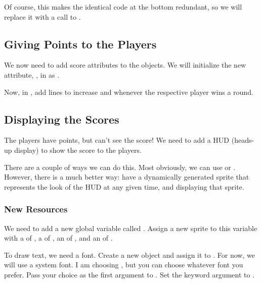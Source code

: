 \documentclass[letterpaper,10pt,english]{sphinxmanual}
\begin{document}
Of course, this makes the identical code at the bottom redundant, so we
will replace it with a call to .


\subsection{Giving Points to the Players}
\label{pong_better:giving-points-to-the-players}
We now need to add score attributes to the  objects.  We
will initialize the new attribute, , in
 as .

Now, in , add lines to increase
 and  whenever the respective
player wins a round.


\subsection{Displaying the Scores}
\label{pong_better:displaying-the-scores}
The players have points, but can't see the score!  We need to add a HUD
(heads-up display) to show the score to the players.

There are a couple of ways we can do this.  Most obviously, we can use
{\hyperref[dsp:sge.dsp.Game.project_text]{\emph{}}} or {\hyperref[dsp:sge.dsp.Room.project_text]{\emph{}}}.
However, there is a much better way: have a dynamically generated sprite
that represents the look of the HUD at any given time, and displaying
that sprite.


\subsubsection{New Resources}
\label{pong_better:new-resources}
We need to add a new global variable called .  Assign
a new sprite to this variable with a  of , a
 of , an  of , and an
 of .

To draw text, we need a font.  Create a new {\hyperref[gfx:sge.gfx.Font]{\emph{}}} object
and assign it to .  For now, we will use a system font.
I am choosing , but you can choose whatever font
you prefer.  Pass your choice as the first argument to
{\hyperref[gfx:sge.gfx.Font.__init__]{\emph{}}}.  Set the  keyword argument to
.
\end{document}
